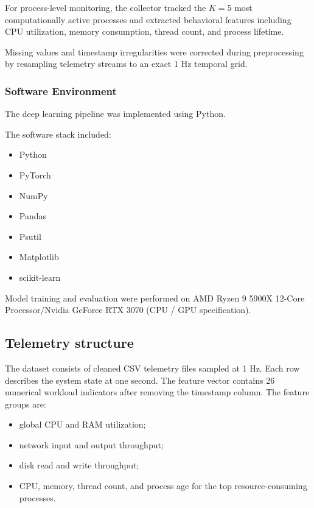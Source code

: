 \documentclass[a4paper,12pt]{extarticle}
\begin{document}
For process-level monitoring, the collector tracked the $K=5$ most computationally active processes and extracted behavioral features including CPU utilization, memory consumption, thread count, and process lifetime.

Missing values and timestamp irregularities were corrected during preprocessing by resampling telemetry streams to an exact 1 Hz temporal grid.

\subsubsection{Software Environment}

The deep learning pipeline was implemented using Python.

The software stack included:

\begin{itemize}
    \item Python 
    \item PyTorch 
    \item NumPy
    \item Pandas
    \item Psutil
    \item Matplotlib
    \item scikit-learn
\end{itemize}

Model training and evaluation were performed on AMD Ryzen 9 5900X 12-Core Processor/Nvidia GeForce RTX 3070 (CPU / GPU specification).

\subsection{Telemetry structure}

The dataset consists of cleaned CSV telemetry files sampled at 1 Hz. Each row describes the system state at one second. The feature vector contains 26 numerical workload indicators after removing the timestamp column. The feature groups are:
\begin{itemize}
    \item global CPU and RAM utilization;
    \item network input and output throughput;
    \item disk read and write throughput;
    \item CPU, memory, thread count, and process age for the top resource-consuming processes.
\end{itemize}
\end{document}
